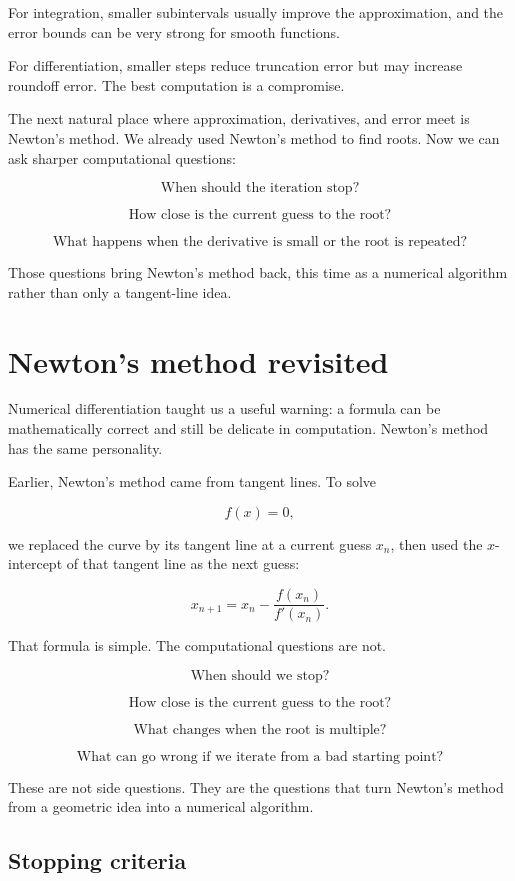 For integration, smaller subintervals usually improve the approximation, and the error
bounds can be very strong for smooth functions.

For differentiation, smaller steps reduce truncation error but may increase roundoff
error.  The best computation is a compromise.

The next natural place where approximation, derivatives, and error meet is Newton's
method.  We already used Newton's method to find roots.  Now we can ask sharper
computational questions:

\[
\text{When should the iteration stop?}
\]

\[
\text{How close is the current guess to the root?}
\]

\[
\text{What happens when the derivative is small or the root is repeated?}
\]

Those questions bring Newton's method back, this time as a numerical algorithm rather
than only a tangent-line idea.
\section{Newton's method revisited}
\label{sec:newtons-method-revisited}

Numerical differentiation taught us a useful warning: a formula can be mathematically
correct and still be delicate in computation.  Newton's method has the same personality.

Earlier, Newton's method came from tangent lines.  To solve

\[
f(x)=0,
\]

we replaced the curve by its tangent line at a current guess \(x_n\), then used the
\(x\)-intercept of that tangent line as the next guess:

\[
\boxed{
x_{n+1}=x_n-\frac{f(x_n)}{f'(x_n)}.
}
\]

That formula is simple.  The computational questions are not.

\[
\text{When should we stop?}
\]

\[
\text{How close is the current guess to the root?}
\]

\[
\text{What changes when the root is multiple?}
\]

\[
\text{What can go wrong if we iterate from a bad starting point?}
\]

These are not side questions.  They are the questions that turn Newton's method from a
geometric idea into a numerical algorithm.

\subsection{Stopping criteria}
\label{subsec:newton-stopping-criteria}

